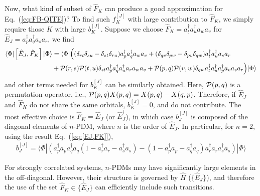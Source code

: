 \documentclass[prb,amsmath,amsfonts,amssymb]{revtex4}
\begin{document}
Now, what kind of subset of $\hat F_K$ can produce a good approximation for Eq.~(\ref{eq:FB-QITE})? To find such $f^{[J]}_K$ with large contribution to $\hat F_K$, we simply require those $K$ with large $b^{[J]}_K$. Suppose we choose $\hat F_K = a^\dag_t a^\dag_u a_w a_v$ for $\hat E_J = a^\dag_p a^\dag_q a_s a_r$, we find
\begin{align}
	\langle \Phi| \left[\hat E_J , \hat F_K\right]|\Phi\rangle & = \langle \Phi|\Big((\delta_{rt} \delta_{su} - \delta_{st} \delta_{ru}) a^\dag_p a^\dag_q a_w a_v +(\delta_{qv} \delta_{pw}-\delta_{pv }\delta_{qw}) a_t^\dag a_u^\dag    a_s 	a_r \nonumber\\ 
	&+{\cal P}(r,s) {\cal P}(t,u) \delta_{st}  a^\dag_p a^\dag_q a^\dag_u a_r  a_w a_v 
	+{\cal P}(p,q){\cal P}(v,w)\delta_{qw}a_t^\dag a_u^\dag a_p^\dag a_v  a_s 	a_r \Big)|\Phi\rangle\label{eq:[EJ,FK]}
\end{align}
and other terms needed for $b_K^{[J]}$ can be similarly obtained. Here, ${\cal P}(p,q)$ is a permutation operator, i.e., ${\cal P}(p,q) X(p,q) = X(p,q) - X(q,p)$. Therefore, if $\hat E_J$ and $\hat F_K$ do not share the same orbitals, $b_K^{[J]} = 0$, and do not contribute. The most effective choice is $\hat F_K = \hat E_J$ (or $\hat E_J^\dag$), in which case $b^{[J]}_J$ is composed of the diagonal elements of $n$-PDM, where $n$ is the order of $\hat E_J$. In particular, for $n=2$, using the result Eq.~(\ref{eq:[EJ,FK]}), 
\begin{align}
	b_J^{[J]} = \langle \Phi| \left(a_p^\dag a_p a_q^\dag a_q (1 - a_r^\dag a_r - a_s^\dag a_s) - (1 - a_p^\dag a_p - a_q^\dag a_q) a_r^\dag a_r a_s^\dag a_s\right)|\Phi\rangle
\end{align}

For strongly correlated systems, $n$-PDMs may have significantly large elements in the off-diagonal. However, their structure is governed by $\hat H$ ($\{\hat E_J\}$), and therefore the use of the set $\hat F_K \in \{\hat E_J\}$ can efficiently include such transitions. 
\end{document}
